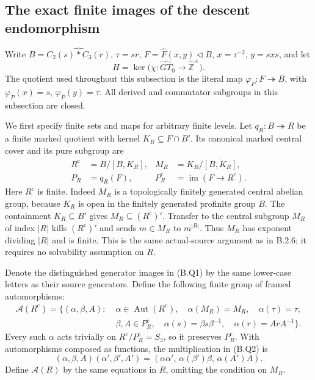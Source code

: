 \subsection{The exact finite images of the descent endomorphism}

Write $B=\widehat{C_2(s)*C_3(r)}$, $\tau=sr$,
$F=\widehat F(x,y)\triangleleft B$, $x=\tau^{-2}$,
$y=sxs$, and let
\[
 H=\ker\bigl(\chi:\widehat{GT}_0\longrightarrow
                         \widehat{\mathbb Z}^{\times}\bigr).
\]
The quotient used throughout this subsection is the literal
map $\varphi_P:F\twoheadrightarrow B$, with
$\varphi_P(x)=s$, $\varphi_P(y)=\tau$.  All derived and
commutator subgroups in this subsection are closed.

We first specify finite sets and maps for arbitrary finite
levels.  Let $q_R:B\twoheadrightarrow R$ be a finite marked
quotient with kernel $K_R\subseteq F\cap B'$.  Its canonical
marked central cover and its pure subgroup are
\[
\begin{aligned}
 R^{\mathrm c}&=B/\overline{[B,K_R]},&
 M_R&=K_R/\overline{[B,K_R]},\\
 P_R&=q_R(F),&
 P_R^{\mathrm c}&=\operatorname{im}(F\longrightarrow R^{\mathrm c}).
\end{aligned}                                                   \tag{B.Q1}
\]
Here $R^{\mathrm c}$ is finite.  Indeed $M_R$ is a
topologically finitely generated central abelian group,
because $K_R$ is open in the finitely generated profinite
group $B$.  The containment $K_R\subseteq B'$ gives
$M_R\subseteq(R^{\mathrm c})'$.  Transfer to the central
subgroup $M_R$ of index $|R|$ kills $(R^{\mathrm c})'$ and
sends $m\in M_R$ to $m^{|R|}$.  Thus $M_R$ has exponent
dividing $|R|$ and is finite.  This is the same actual-source
argument as in B.2.6; it requires no solvability assumption
on $R$.

Denote the distinguished generator images in (B.Q1) by the
same lower-case letters as their source generators.  Define
the following finite group of framed automorphisms:
\[
\begin{split}
 \mathcal A(R^{\mathrm c})=\bigl\{(\alpha,\beta,A):\;&
 \alpha\in\operatorname{Aut}(R^{\mathrm c}),\quad
 \alpha(M_R)=M_R,\quad\alpha(\tau)=\tau,\\
 &\beta,A\in P_R^{\mathrm c},\quad
 \alpha(s)=\beta s\beta^{-1},\quad
 \alpha(r)=ArA^{-1}\bigr\}.
\end{split}                                                    \tag{B.Q2}
\]
Every such $\alpha$ acts trivially on
$R^{\mathrm c}/P_R^{\mathrm c}=S_3$, so it preserves
$P_R^{\mathrm c}$.  With automorphisms composed as functions,
the multiplication in (B.Q2) is
\[
 (\alpha,\beta,A)(\alpha',\beta',A')
   =(\alpha\alpha',\,\alpha(\beta')\beta,
                        \,\alpha(A')A).                       \tag{B.Q3}
\]
Define $\mathcal A(R)$ by the same equations in $R$, omitting
the condition on $M_R$.

